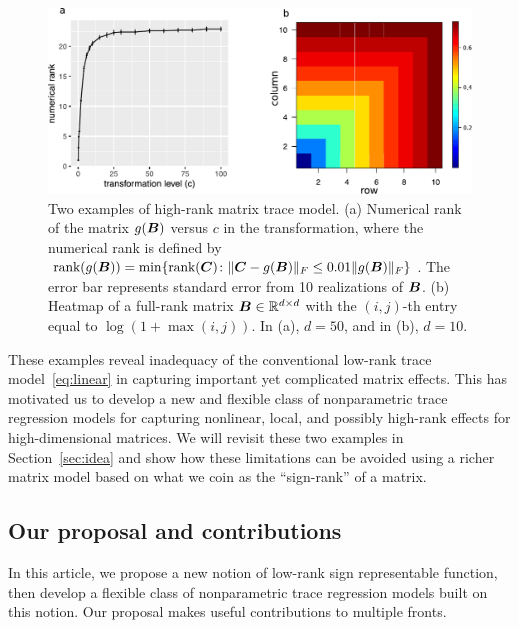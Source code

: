\documentclass[aos]{imsart}
\theoremstyle{definition}
\def\rank{\textup{rank}}
\begin{document}
\begin{figure}
\includegraphics[width=.8\textwidth]{figure/low_rank.pdf}
\caption{Two examples of high-rank matrix trace model. (a) Numerical rank of the matrix $g(\bm B)$ versus $c$ in the transformation, where the numerical rank is defined by $\rank(g(\mB))=\min\{\rank(\mC )\colon \FnormSize{}{\mC-g(\mB)} \leq 0.01 \FnormSize{}{g(\mB)} \}$. The error bar represents standard error from 10 realizations of $\bm B$. (b) Heatmap of a full-rank matrix $\bm B\in\mathbb{R}^{d\times d}$ with the $(i,j)$-th entry equal to $\log(1+\max(i,j))$. In (a), $d=50$, and in (b), $d=10$.} 
\label{fig:limit}
\label{penG}
\end{figure}

These examples reveal inadequacy of the conventional low-rank trace model~\eqref{eq:linear} in capturing important yet complicated matrix effects. This has motivated us to develop a new and flexible class of nonparametric trace regression models for capturing nonlinear, local, and possibly high-rank effects for high-dimensional matrices. We will revisit these two examples in Section~\ref{sec:idea} and show how these limitations can be avoided using a richer matrix model based on what we coin as the ``sign-rank'' of a matrix. 

\subsection{Our proposal and contributions}

In this article, we propose a new notion of low-rank sign representable function, then develop a flexible class of nonparametric trace regression models built on this notion. Our proposal makes useful contributions to multiple fronts. 
\end{document}
